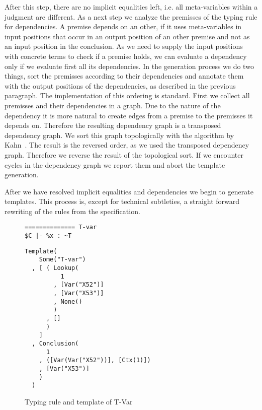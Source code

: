 
After this step, there are no implicit equalities left, i.e. all
meta-variables within a judgment are different. As a next step we
analyze the premisses of the typing rule for dependencies. A premise
depends on an other, if it uses meta-variables in input positions that
occur in an output position of an other premise and not as an input
position in the conclusion. As we need to supply the input positions
with concrete terms to check if a premise holds, we can evaluate a
dependency only if we evaluate first all its dependencies. In the
generation process we do two things, sort the premisses according to
their dependencies and annotate them with the output positions of the
dependencies, as described in the previous paragraph. The
implementation of this ordering is standard. First we collect all
premisses and their dependencies in a graph. Due to the nature of the
dependency it is more natural to create edges from a premise to the
premisses it depends on. Therefore the resulting dependency graph is a
transposed dependency graph. We sort this graph topologically with the
algorithm by Kahn~\cite{Kahn:1962:TSL:368996.369025}. The result is
the reversed order, as we used the transposed dependency
graph. Therefore we reverse the result of the topological sort. If we
encounter cycles in the dependency graph we report them and abort the
template generation.

After we have resolved implicit equalities and dependencies we begin
to generate templates. This process is, except for technical
subtleties, a straight forward rewriting of the rules from the
specification. 

\begin{figure}
  \centering
  \begin{minipage}{.35\linewidth}
\begin{lstlisting}[language=sltc]
%x : ~T in $C
============== T-var
$C |- %x : ~T
\end{lstlisting}
  \end{minipage}
  \begin{minipage}{.55\linewidth}
\begin{lstlisting}[language=sltc]
Template(
    Some("T-var")
  , [ ( Lookup(
          1
        , [Var("X52")]
        , [Var("X53")]
        , None()
        )
      , []
      )
    ]
  , Conclusion(
      1
    , ([Var(Var("X52"))], [Ctx(1)])
    , [Var("X53")]
    )
  )
\end{lstlisting}
  \end{minipage}
  \caption{Typing rule and template of T-Var}
  \label{fig:template-example}
\end{figure}
